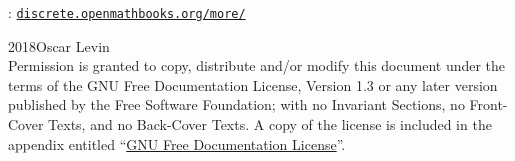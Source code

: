 \documentclass[oneside,10pt,]{book}
\newcommand{\mono}[1]{\texttt{#1}}
\numberwithin{equation}{chapter}
\begin{document}
\frontmatter

\thispagestyle{empty}
\hypertarget{g:colophon:idp211283323088}{}
: \href{http:\slash{}\slash{}discrete.openmathbooks.org\slash{}more\slash{}}{\mono{discrete.openmathbooks.org/more/}}\par\medskip
\noindent\textcopyright{}2018\quad{}Oscar Levin\\[0.5\baselineskip]
Permission is granted to copy, distribute and\slash{}or modify this document under the terms of the GNU Free Documentation License, Version 1.3 or any later version published by the Free Software Foundation; with no Invariant Sections, no Front-Cover Texts, and no Back-Cover Texts.  A copy of the license is included in the appendix entitled ``\hyperref[x:appendix:appendix-gfdl]{GNU Free Documentation License}''.\par\medskip
{}
\null\clearpage
\end{document}
